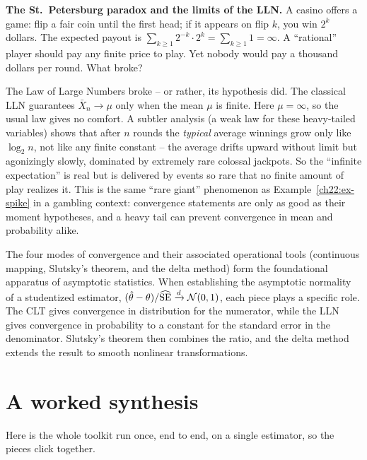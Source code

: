 \begin{paradoxbox}
\textbf{The St.\ Petersburg paradox and the limits of the LLN.} A casino offers a game:
flip a fair coin until the first head; if it appears on flip $k$, you win $2^k$ dollars.
The expected payout is $\sum_{k\ge1} 2^{-k}\cdot 2^k = \sum_{k\ge1}1 = \infty$. A
``rational'' player should pay any finite price to play. Yet nobody would pay a thousand
dollars per round. What broke?

The Law of Large Numbers broke -- or rather, its hypothesis did. The classical LLN
guarantees $\bar X_n\to\mu$ only when the mean $\mu$ is finite. Here $\mu=\infty$, so
the usual law gives no comfort. A subtler analysis (a weak law for these heavy-tailed
variables) shows that after $n$ rounds the \emph{typical} average winnings grow only
like $\log_2 n$, not like any finite constant -- the average drifts upward without
limit but agonizingly slowly, dominated by extremely rare colossal jackpots. So the
``infinite expectation'' is real but is delivered by events so rare that no finite
amount of play realizes it. This is the same ``rare giant'' phenomenon as
Example~\ref{ch22:ex-spike} in a gambling context: convergence statements
are only as good as their moment hypotheses, and a heavy tail can prevent convergence in
mean and probability alike.
\end{paradoxbox}

\begin{aestheticbox}
The four modes of convergence and their associated operational tools (continuous mapping,
Slutsky's theorem, and the delta method) form the foundational apparatus of asymptotic statistics.
When establishing the asymptotic normality of a studentized estimator,
$(\hat\theta-\theta)/\widehat{\mathrm{SE}} \xrightarrow{d}\mathcal{N}(0,1)$, each piece plays a specific
role. The CLT gives convergence in distribution for the numerator, while the LLN gives
convergence in probability to a constant for the standard error in the denominator.
Slutsky's theorem then combines the ratio, and the delta method extends the result to
smooth nonlinear transformations.
\end{aestheticbox}

\section{A worked synthesis}
\label{ch22:synthesis}

Here is the whole toolkit run once, end to end, on a single estimator, so the pieces
click together.

